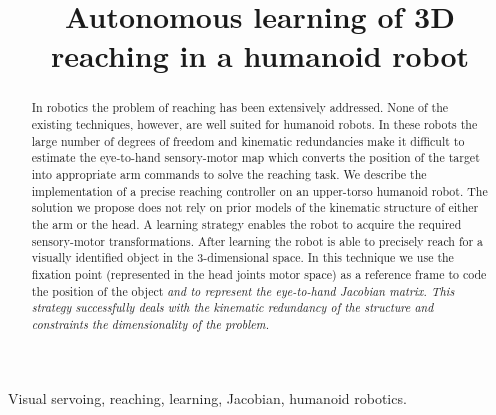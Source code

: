 \documentclass[conference,letterpaper]{ieeeconf}
\begin{document}
\title{\huge Autonomous learning of 3D reaching in a humanoid robot}

\author{
\and
{}
}

\maketitle
\begin{abstract}
In robotics the problem of reaching has been extensively addressed. None 
of the existing techniques, however, are well suited for humanoid robots.
In these robots the large number of degrees of freedom and kinematic 
redundancies make it difficult to estimate the eye-to-hand 
sensory-motor map which converts the position of the target into 
appropriate arm commands to solve the reaching task. We describe the 
implementation of a precise reaching controller on an upper-torso humanoid 
robot. The solution we propose does not rely on prior models of the 
kinematic structure of either the arm or the head. A learning strategy 
enables the robot to acquire the required sensory-motor transformations.
After learning the robot is able to precisely reach for a visually identified
object in the 3-dimensional space. In this technique we use the fixation point 
(represented in the head joints motor space) as a reference frame 
to code the position of the object \em{and} to represent the eye-to-hand 
Jacobian matrix. This strategy successfully deals with the kinematic
redundancy of the structure and constraints the dimensionality of the 
problem.
\end{abstract}

\begin{keywords}
Visual servoing, reaching, learning, Jacobian, humanoid robotics.
\end{keywords}
%







%



\end{document}
